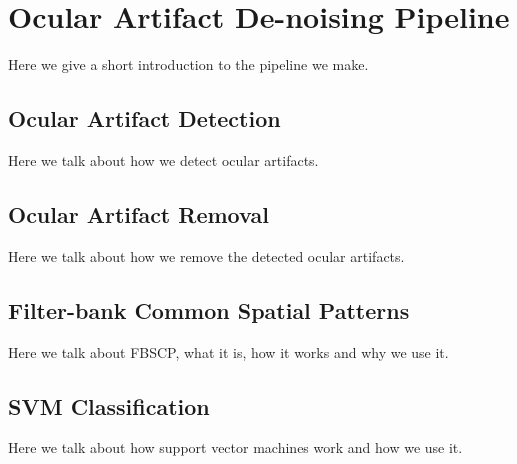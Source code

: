 \section{Ocular Artifact De-noising Pipeline}
Here we give a short introduction to the pipeline we make.
\subsection{Ocular Artifact Detection}
Here we talk about how we detect ocular artifacts.
\subsection{Ocular Artifact Removal}
Here we talk about how we remove the detected ocular artifacts.
\subsection{Filter-bank Common Spatial Patterns}
Here we talk about FBSCP, what it is, how it works and why we use it.
\subsection{SVM Classification}
Here we talk about how support vector machines work and how we use it.
